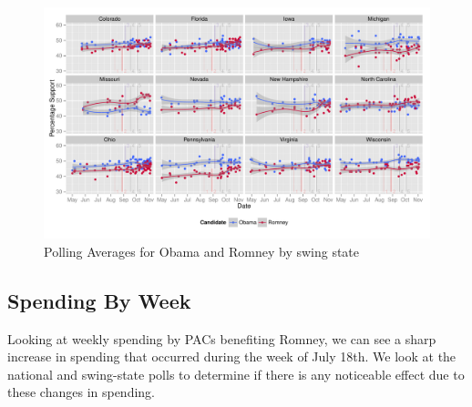 \documentclass[11pt]{article}\usepackage{graphicx, color}
\newenvironment{knitrout}{}{} %
\begin{document}
\begin{knitrout}
\color{fgcolor}\begin{figure}[H]


{\centering \includegraphics[width=\textwidth]{figure/type_swing_1} 

}

\caption[Polling Averages for Obama and Romney by swing state]{Polling Averages for Obama and Romney by swing state\label{fig:type_swing_1}}
\end{figure}

\end{knitrout}



\subsection{Spending By Week}

Looking at weekly spending by PACs benefiting Romney, we can see a sharp increase in spending that occurred during the week of July 18th. We look at the national and swing-state polls to determine if there is any noticeable effect due to these changes in spending.
\end{document}
